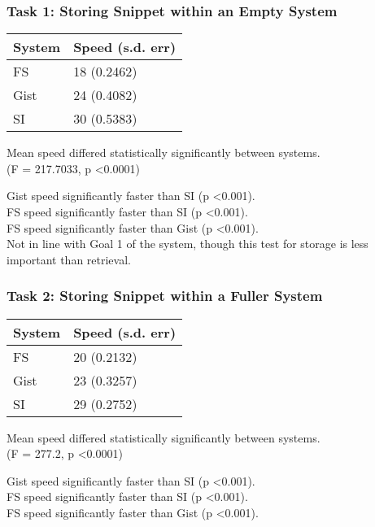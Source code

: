 \subsubsection{Task 1: Storing Snippet within an Empty System}
\begin{table}[H]
\label{speedtabletask1}
\begin{tabular}{ll}
\hline
\textbf{System} & \textbf{Speed (s.d. err)} \\ \hline
FS              & 18 (0.2462)     \\ 
Gist            & 24 (0.4082)     \\ 
SI              & 30 (0.5383)     \\ \hline
\end{tabular}
\end{table}

Mean speed differed statistically significantly between systems. \\
(F = 217.7033, p \textless 0.0001)

Gist speed significantly faster than SI (p \textless 0.001). \\
FS speed significantly faster than SI (p \textless 0.001). \\
FS speed significantly faster than Gist (p \textless 0.001). \\

Not in line with Goal 1 of the system, though this test for storage is less important than retrieval.

\subsubsection{Task 2: Storing Snippet within a Fuller System}
\begin{table}[H]
\label{speedtabletask2}
\begin{tabular}{ll}
\hline
\textbf{System} & \textbf{Speed (s.d. err)} \\ \hline
FS              & 20 (0.2132)     \\ 
Gist            & 23 (0.3257)     \\ 
SI              & 29 (0.2752)     \\ \hline
\end{tabular}
\end{table}

Mean speed differed statistically significantly between systems. \\
(F = 277.2, p \textless 0.0001)

Gist speed significantly faster than SI (p \textless 0.001). \\
FS speed significantly faster than SI (p \textless 0.001). \\
FS speed significantly faster than Gist (p \textless 0.001). \\

